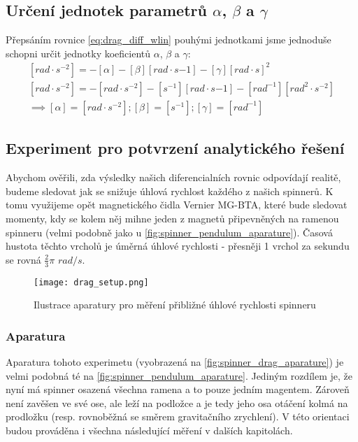 \documentclass[12pt, a4paper,
 twoside,        %
 openright
]{report}
\begin{document}
\subsection{Určení jednotek parametrů $\alpha$, $\beta$ a $\gamma$}

Přepsáním rovnice \ref{eq:drag_diff_wlin} pouhými jednotkami jsme jednoduše schopni určit jednotky koeficientů $\alpha$, $\beta$ a $\gamma$:
\begin{equation}
    \label{eq:drag_units}
    \begin{gathered}
        [rad \cdot s^{-2}] = - [\alpha] - [\beta] [rad \cdot s{-1}] - [\gamma] [rad \cdot s]^2 \\
        [rad \cdot s^{-2}] = - [rad \cdot s^{-2}] - [s^{-1}] [rad \cdot s{-1}] - [rad^{-1}] [rad^2 \cdot s^{-2}] \\
        \implies [\alpha] = [rad \cdot s^{-2}]; [\beta] = [s^{-1}]; [\gamma] = [rad^{-1}]
    \end{gathered}
\end{equation}

\clearpage

\subsection{Experiment pro potvrzení analytického řešení}

Abychom ověřili, zda výsledky našich diferencialních rovnic odpovídají realitě, budeme sledovat jak se snižuje úhlová rychlost každého z našich spinnerů. K tomu využijeme opět magnetického čidla Vernier MG-BTA, které bude sledovat momenty, kdy se kolem něj mihne jeden z magnetů připevněných na ramenou spinneru (velmi podobně jako u \autoref{fig:spinner_pendulum_aparature}). Časová hustota těchto vrcholů je úměrná úhlové rychlosti - přesněji 1 vrchol za sekundu se rovná $\frac{2}{3}\pi$ $rad/s$.

\begin{wrapfigure}{r}{0.5\textwidth}
    \vspace*{-1.5cm}
    \texttt{[image: drag\_setup.png]}
    \centering
    \caption{Ilustrace aparatury pro měření přibližné úhlové rychlosti spinneru}
    \label{fig:spinner_drag_aparature}
\end{wrapfigure}

\subsubsection{Aparatura}
Aparatura tohoto experimetu (vyobrazená na \autoref{fig:spinner_drag_aparature}) je velmi podobná té na \autoref{fig:spinner_pendulum_aparature}. Jediným rozdílem je, že nyní má spinner osazená všechna ramena a to pouze jedním magentem. Zároveň není zavěšen ve své ose, ale leží na podložce a je tedy jeho osa otáčení kolmá na prodložku (resp. rovnoběžná se směrem gravitačního zrychlení). V této orientaci budou prováděna i všechna následující měření v dalších kapitolách.
\end{document}

